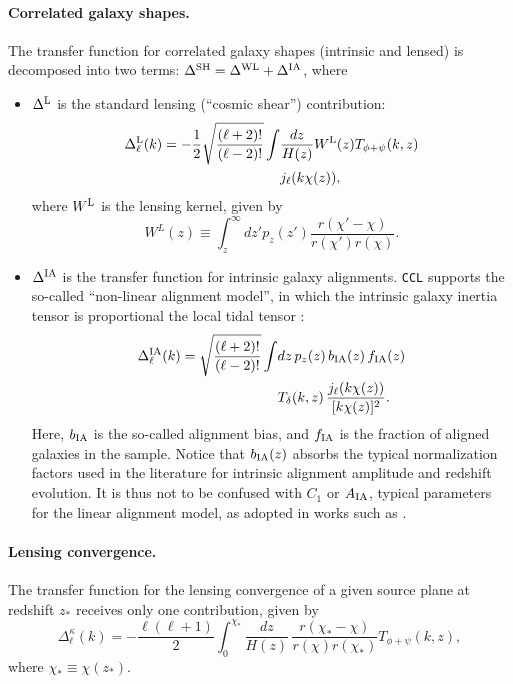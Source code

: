\documentclass[\docopts]{\docclass}
\newcommand{\ccl}{{\tt CCL}\xspace}
\begin{document}
\paragraph{\bf Correlated galaxy shapes.} The transfer function for correlated galaxy shapes (intrinsic and lensed) is decomposed into two terms: $\Delta^{\rm SH}=\Delta^{\rm WL}+\Delta^{\rm IA}$, where
\begin{itemize}
  \item $\Delta^{\rm L}$ is the standard lensing (``cosmic shear'') contribution:
    \begin{align} \label{eq:transfer_lensing}
      \nonumber
      \Delta_\ell^{\rm L}(k)=-\frac{1}{2}\sqrt{\frac{(\ell+2)!}{(\ell-2)!}}\int &\frac{dz}{H(z)} W^{\rm L}(z)T_{\phi+\psi}(k,z)\\
      &j_\ell(k\chi(z)),
    \end{align}
    where $W^{\rm L}$ is the lensing kernel, given by
    \begin{equation}
      W^L(z)\equiv\int_z^\infty dz' p_z(z')\frac{r(\chi'-\chi)}{r(\chi')r(\chi)}.
    \end{equation}
  \item $\Delta^{\rm IA}$ is the transfer function for intrinsic galaxy alignments. \ccl supports the so-called ``non-linear alignment model'', in which the intrinsic galaxy inertia tensor is proportional the local tidal tensor \cite{2004PhRvD..70f3526H,2007MNRAS.381.1197H}:
    \begin{align}\nonumber
      \Delta_\ell^{\rm IA}(k)=\sqrt{\frac{(\ell+2)!}{(\ell-2)!}}\int &dz\,p_z(z)\,b_{\rm IA}(z)\,f_{\rm IA}(z)\\
      &T_\delta(k,z)\,\frac{j_\ell(k\chi(z))}{[k\chi(z)]^2}.
    \end{align}
    Here, $b_{\rm IA}$ is the so-called alignment bias, and $f_{\rm IA}$ is the fraction of aligned galaxies in the sample. Notice that $b_{\rm IA}(z)$ absorbs the typical normalization factors used in the literature for intrinsic alignment amplitude and redshift evolution. It is thus not to be confused with $C_1$ or $A_{\rm IA}$, typical parameters for the linear alignment model, as adopted in works such as \cite{Blazek17,vanUitert18,Joudaki18,Hildebrandt17}.
\end{itemize}

\paragraph{\bf Lensing convergence.} The transfer function for the lensing convergence of a given source plane at redshift $z_*$ receives only one contribution, given by
\begin{equation}
  \Delta_\ell^\kappa(k)=-\frac{\ell(\ell+1)}{2}\int_0^{\chi_*}\frac{dz}{H(z)}\,\frac{r(\chi_*-\chi)}{r(\chi)r(\chi_*)}T_{\phi+\psi}(k,z),
  \label{eq:cmblens}
\end{equation}
where $\chi_*\equiv\chi(z_*)$.
\end{document}
